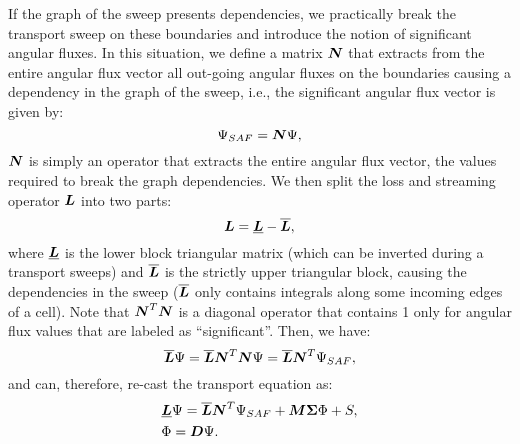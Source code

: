 If the graph of the sweep presents dependencies, we practically break the
transport sweep on these boundaries and introduce the notion of significant
angular fluxes. In this situation, we define a matrix $\boldsymbol{N}$ that extracts
from the entire angular flux vector all out-going angular fluxes on the
boundaries causing a dependency in the graph of the sweep, i.e., the
significant angular flux vector is given by:
\begin{equation}
  \Psi_{SAF} = \boldsymbol{N} \Psi,
\end{equation}
$\boldsymbol{N}$ is simply an operator that extracts the entire angular flux vector,
the values required to break the graph dependencies. We then split the loss
and streaming operator $\boldsymbol{L}$ into two parts:
\begin{equation}
  \boldsymbol{L} = \underline{\boldsymbol{L}} - \overline{\boldsymbol{L}},
\end{equation}
where $\underline{\boldsymbol{L}}$ is the lower block triangular matrix (which can be
inverted during a transport sweeps) and $\overline{\boldsymbol{L}}$ is the strictly
upper triangular block, causing the dependencies in the sweep
($\overline{\boldsymbol{L}}$ only contains integrals along some incoming edges of a
cell). Note that $\boldsymbol{N}^T\boldsymbol{N}$ is a diagonal operator that contains 1 only
for angular flux values that are labeled as ``significant''. Then, we have:
\begin{equation}
  \overline{\boldsymbol{L}} \Psi = \overline{\boldsymbol{L}} \boldsymbol{N}^T\boldsymbol{N}\Psi =
  \overline{\boldsymbol{L}}\boldsymbol{N}^T \Psi_{SAF},
\end{equation}
and can, therefore, re-cast the transport equation as:
\begin{align}
  &\underline{\boldsymbol{L}}\Psi =\overline{\boldsymbol{L}}\boldsymbol{N}^T \Psi_{SAF} + \boldsymbol{M\Sigma}
  \Phi + S,\\
  &\Phi = \boldsymbol{D}\Psi.
\end{align}
